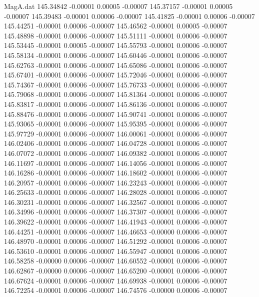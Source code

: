 \begin{filecontents}{MagA.dat}
 145.34842   -0.00001    0.00005   -0.00007
 145.37157   -0.00001    0.00005   -0.00007
 145.39483   -0.00001    0.00006   -0.00007
 145.41825   -0.00001    0.00006   -0.00007
 145.44251   -0.00001    0.00006   -0.00007
 145.46562   -0.00001    0.00005   -0.00007
 145.48898   -0.00001    0.00006   -0.00007
 145.51111   -0.00001    0.00006   -0.00007
 145.53445   -0.00001    0.00005   -0.00007
 145.55793   -0.00001    0.00006   -0.00007
 145.58134   -0.00001    0.00006   -0.00007
 145.60446   -0.00001    0.00006   -0.00007
 145.62763   -0.00001    0.00006   -0.00007
 145.65086   -0.00001    0.00006   -0.00007
 145.67401   -0.00001    0.00006   -0.00007
 145.72046   -0.00001    0.00006   -0.00007
 145.74367   -0.00001    0.00006   -0.00007
 145.76733   -0.00001    0.00006   -0.00007
 145.79068   -0.00001    0.00006   -0.00007
 145.81364   -0.00001    0.00006   -0.00007
 145.83817   -0.00001    0.00006   -0.00007
 145.86136   -0.00001    0.00006   -0.00007
 145.88476   -0.00001    0.00006   -0.00007
 145.90741   -0.00001    0.00006   -0.00007
 145.93065   -0.00001    0.00006   -0.00007
 145.95395   -0.00001    0.00006   -0.00007
 145.97729   -0.00001    0.00006   -0.00007
 146.00061   -0.00001    0.00006   -0.00007
 146.02406   -0.00001    0.00006   -0.00007
 146.04728   -0.00001    0.00006   -0.00007
 146.07072   -0.00001    0.00006   -0.00007
 146.09382   -0.00001    0.00006   -0.00007
 146.11697   -0.00001    0.00006   -0.00007
 146.14056   -0.00001    0.00006   -0.00007
 146.16286   -0.00001    0.00006   -0.00007
 146.18602   -0.00001    0.00006   -0.00007
 146.20957   -0.00001    0.00006   -0.00007
 146.23243   -0.00001    0.00006   -0.00007
 146.25633   -0.00001    0.00006   -0.00007
 146.28028   -0.00001    0.00006   -0.00007
 146.30231   -0.00001    0.00006   -0.00007
 146.32567   -0.00001    0.00006   -0.00007
 146.34996   -0.00001    0.00006   -0.00007
 146.37307   -0.00001    0.00006   -0.00007
 146.39622   -0.00001    0.00006   -0.00007
 146.41943   -0.00001    0.00006   -0.00007
 146.44251   -0.00001    0.00006   -0.00007
 146.46653   -0.00000    0.00006   -0.00007
 146.48970   -0.00001    0.00006   -0.00007
 146.51292   -0.00001    0.00006   -0.00007
 146.53610   -0.00001    0.00006   -0.00007
 146.55947   -0.00001    0.00006   -0.00007
 146.58258   -0.00000    0.00006   -0.00007
 146.60552   -0.00001    0.00006   -0.00007
 146.62867   -0.00000    0.00006   -0.00007
 146.65200   -0.00001    0.00006   -0.00007
 146.67624   -0.00001    0.00006   -0.00007
 146.69938   -0.00001    0.00006   -0.00007
 146.72254   -0.00001    0.00006   -0.00007
 146.74576   -0.00000    0.00006   -0.00007

\end{filecontents}

